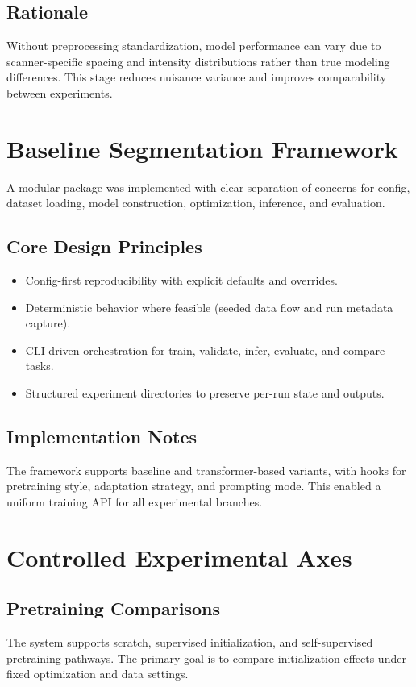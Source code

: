 \documentclass[11pt,a4paper]{article}
\begin{document}
\subsection{Rationale}
Without preprocessing standardization, model performance can vary due to scanner-specific spacing and intensity distributions rather than true modeling differences. This stage reduces nuisance variance and improves comparability between experiments.

\section{Baseline Segmentation Framework}
A modular package was implemented with clear separation of concerns for config, dataset loading, model construction, optimization, inference, and evaluation.

\subsection{Core Design Principles}
\begin{itemize}
\item Config-first reproducibility with explicit defaults and overrides.
\item Deterministic behavior where feasible (seeded data flow and run metadata capture).
\item CLI-driven orchestration for train, validate, infer, evaluate, and compare tasks.
\item Structured experiment directories to preserve per-run state and outputs.
\end{itemize}

\subsection{Implementation Notes}
The framework supports baseline and transformer-based variants, with hooks for pretraining style, adaptation strategy, and prompting mode. This enabled a uniform training API for all experimental branches.

\section{Controlled Experimental Axes}
\subsection{Pretraining Comparisons}
The system supports scratch, supervised initialization, and self-supervised pretraining pathways. The primary goal is to compare initialization effects under fixed optimization and data settings.
\end{document}

